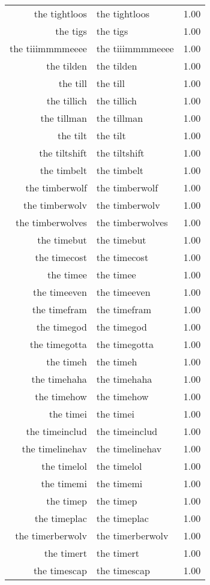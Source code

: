 \begin{table}[ht]
\begin{tabular}{rlr}
  the tightloos & the tightloos & 1.00 \\ 
  the tigs & the tigs & 1.00 \\ 
  the tiiimmmmeeee & the tiiimmmmeeee & 1.00 \\ 
  the tilden & the tilden & 1.00 \\ 
  the till & the till & 1.00 \\ 
  the tillich & the tillich & 1.00 \\ 
  the tillman & the tillman & 1.00 \\ 
  the tilt & the tilt & 1.00 \\ 
  the tiltshift & the tiltshift & 1.00 \\ 
  the timbelt & the timbelt & 1.00 \\ 
  the timberwolf & the timberwolf & 1.00 \\ 
  the timberwolv & the timberwolv & 1.00 \\ 
  the timberwolves & the timberwolves & 1.00 \\ 
  the timebut & the timebut & 1.00 \\ 
  the timecost & the timecost & 1.00 \\ 
  the timee & the timee & 1.00 \\ 
  the timeeven & the timeeven & 1.00 \\ 
  the timefram & the timefram & 1.00 \\ 
  the timegod & the timegod & 1.00 \\ 
  the timegotta & the timegotta & 1.00 \\ 
  the timeh & the timeh & 1.00 \\ 
  the timehaha & the timehaha & 1.00 \\ 
  the timehow & the timehow & 1.00 \\ 
  the timei & the timei & 1.00 \\ 
  the timeinclud & the timeinclud & 1.00 \\ 
  the timelinehav & the timelinehav & 1.00 \\ 
  the timelol & the timelol & 1.00 \\ 
  the timemi & the timemi & 1.00 \\ 
  the timep & the timep & 1.00 \\ 
  the timeplac & the timeplac & 1.00 \\ 
  the timerberwolv & the timerberwolv & 1.00 \\ 
  the timert & the timert & 1.00 \\ 
  the timescap & the timescap & 1.00 \\ 

\end{tabular}
\end{table}

